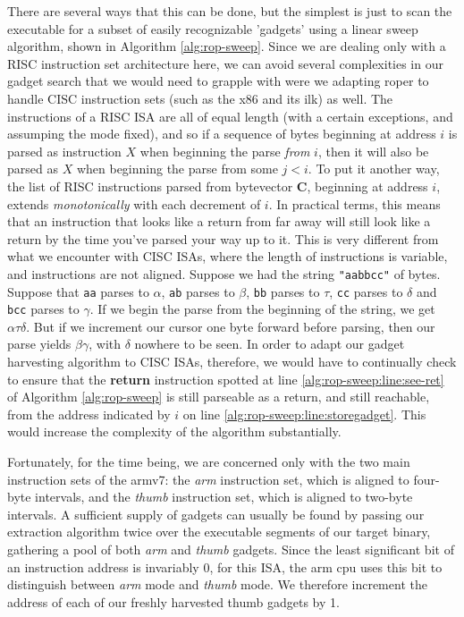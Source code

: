 \documentclass[12pt,glossary]{dalthesis}
\begin{document}
There are several ways that this can be done, but the simplest is just to
scan the executable for a subset of easily recognizable 'gadgets' using a
linear sweep algorithm, shown in Algorithm \ref{alg:rop-sweep}. Since we are
dealing only with a RISC instruction set architecture here, we can avoid 
several complexities in our gadget search that we would need to grapple with
were we adapting \gls{roper} to handle CISC instruction sets (such as the x86 and
its ilk) as well. The instructions of a RISC ISA are all of equal length
(with a certain exceptions, and assumping the mode fixed), and so if a
sequence of bytes beginning at address \(i\) is parsed as instruction \(X\)
when beginning the parse \emph{from} \(i\), then it will also be parsed as \(X\)
when beginning the parse from some \(j < i\). To put it another way, the
list of RISC instructions parsed from bytevector \(\mathbf{C}\), beginning
at address \(i\), extends \emph{monotonically} with each decrement of \(i\).
In practical terms, this means that an instruction that looks like a
return from far away will still look like a return by the time you've parsed your
way up to it. This is very different from what we encounter with CISC ISAs,
where the length of instructions is variable, and instructions are not aligned.
Suppose we had the string \texttt{"aabbcc"} of bytes. Suppose that \texttt{aa} parses to
\(\alpha\), \texttt{ab} parses to \(\beta\), \texttt{bb} parses to \(\tau\), \texttt{cc} parses to \(\delta\) and
\texttt{bcc} parses to \(\gamma\). If we begin the parse from the beginning of the string,
we get \(\alpha \tau \delta\). But if we increment our cursor one byte forward
before parsing, then our parse yields \(\beta \gamma\), with \(\delta\) nowhere
to be seen. In order to adapt our gadget harvesting algorithm to CISC ISAs,
therefore, we would have to continually check to ensure that the \textbf{return}
instruction spotted at line \ref{alg:rop-sweep:line:see-ret} of
Algorithm \ref{alg:rop-sweep} is still parseable as a return, and still reachable, from
the address indicated by \(i\) on line \ref{alg:rop-sweep:line:storegadget}. This
would increase the complexity of the algorithm substantially. 

Fortunately, for the time being, we are concerned only with the two main instruction
sets of the \gls{armv7}: the \emph{arm} instruction set, which is aligned to four-byte intervals, 
and the \emph{thumb} instruction set, which is aligned to two-byte intervals. A sufficient
supply of gadgets can usually be found by passing our extraction algorithm twice
over the executable segments of our target binary, gathering a pool of both \emph{arm}
and \emph{thumb} gadgets. Since the least significant bit of an instruction address is
invariably 0, for this ISA, the \gls{arm} \gls{cpu} uses this bit to distinguish between \emph{arm}
mode and \emph{thumb} mode. We therefore increment the address of each of our freshly
harvested thumb gadgets by 1.
\end{document}

